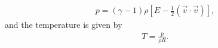\begin{align} 
\label{constitutive}
p = (\gamma-1) \rho \left [ E - \frac{1}{2} (\vec{v} \cdot \vec{v} ) \right ],
\end{align}
 and the temperature is given by
\begin{align} 
\label{enthalpy}
T = \frac{p}{\rho R}.
\end{align}